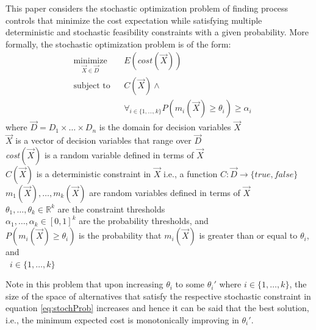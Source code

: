 \documentclass[a4paper, 12pt]{article} %
\begin{document}
This paper considers the stochastic optimization problem of finding process controls that minimize the cost expectation while satisfying multiple deterministic and stochastic feasibility constraints with a given probability.
More formally, the stochastic optimization problem is of the form:
\begin{equation}
\label{eq:stochProb}
\begin{aligned}
& \underset{\vec{X}\in\vec{D}}{\text{minimize}}
& & E(\textit{cost}(\vec{X})) \\
& \text{subject to}
& & C(\vec{X}) \wedge \\
&&& \forall_{i\in\{1,\dots,k\}}P(m_i(\vec{X}) \ge \theta_i) \ge \alpha_i
\end{aligned}
\end{equation}
where $\vec{D} = D_1 \times \dots \times D_n$ is the domain for decision variables $\vec{X}$\\
\indent\indent\indent$\vec{X}$ is a vector of decision variables that range over $\vec{D}$\\
\indent\indent\indent\textit{cost}$(\vec{X})$ is a random variable defined in terms of $\vec{X}$\\
\indent\indent\indent$C(\vec{X})$ is a deterministic constraint in $\vec{X}$ i.e., a function $C:\vec{D} \rightarrow \{true,false\}$\\
\indent\indent\indent $m_1(\vec{X}),\dots,m_k(\vec{X})$ are random variables defined in terms of $\vec{X}$\\
\indent\indent\indent$\theta_1,\dots,\theta_k \in \mathbb{R}^k$ are the constraint thresholds \\
\indent\indent\indent$\alpha_1,\dots,\alpha_k \in [0,1]^k$ are the probability thresholds, and\\
\indent\indent\indent$P(m_i(\vec{X}) \ge \theta_i)$ is the probability that $m_i(\vec{X})$ is greater than or equal to $\theta_i$, and\\\indent\indent\indent\indent\indent\indent\indent~$i\in\{1,\dots,k\}$

Note in this problem that upon increasing $\theta_i$ to some $\theta_i'$ where $i\in\{1,\dots,k\}$, the size of the space of alternatives that satisfy the respective stochastic constraint in equation \ref{eq:stochProb} increases and hence it can be said that the best solution, i.e., the minimum expected cost is monotonically improving in $\theta_i'$.
\end{document}
